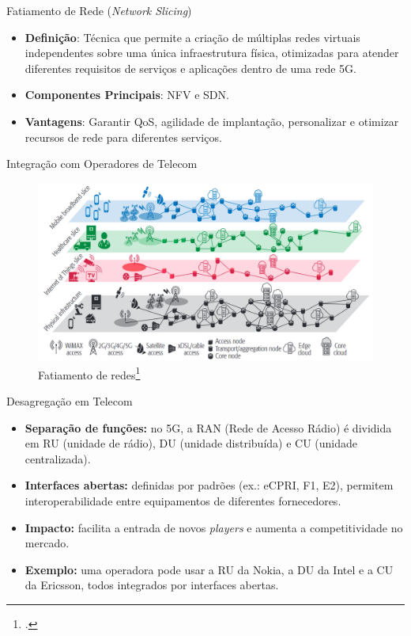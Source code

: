 \begin{frame}{Fatiamento de Rede (\textit{Network Slicing})}
    \begin{itemize}
        \item \textbf{Definição}: Técnica que permite a criação de múltiplas redes virtuais independentes sobre uma única infraestrutura física, otimizadas para atender diferentes requisitos de serviços e aplicações dentro de uma rede 5G.
        \item \textbf{Componentes Principais}: NFV e SDN.
        \item \textbf{Vantagens}: Garantir QoS, agilidade de implantação, personalizar e otimizar recursos de rede para diferentes serviços.
    \end{itemize}
\end{frame}

\begin{frame}{Integração com Operadores de Telecom}
    \begin{figure}[h]
        \centering
        \includegraphics[width=\textwidth]{figs/Network_Slicing.png}
        \caption{Fatiamento de redes\footcite{Network_Slicing}}
    \end{figure}
\end{frame}

\begin{frame}{Desagregação em Telecom}
\begin{itemize}
  \item \textbf{Separação de funções:} no 5G, a RAN (Rede de Acesso Rádio) é dividida em RU (unidade de rádio), DU (unidade distribuída) e CU (unidade centralizada).  
  \item \textbf{Interfaces abertas:} definidas por padrões (ex.: eCPRI, F1, E2), permitem interoperabilidade entre equipamentos de diferentes fornecedores.  
  \item \textbf{Impacto:} facilita a entrada de novos \textit{players} e aumenta a competitividade no mercado.  
  \item \textbf{Exemplo:} uma operadora pode usar a RU da Nokia, a DU da Intel e a CU da Ericsson, todos integrados por interfaces abertas.  
\end{itemize}
\end{frame}

